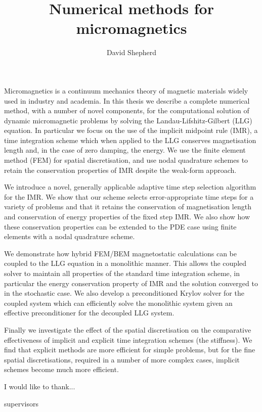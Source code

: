 \documentclass[12pt,PhD,a4paper,pdftex]{muthesis}
\title{Numerical methods for micromagnetics}
\author{David Shepherd}
\numberwithin{equation}{chapter} %
\begin{document}

\tablespagefalse

\beforeabstract
\abstracttitle
Micromagnetics is a continuum mechanics theory of magnetic materials widely used in industry and academia.
In this thesis we describe a complete numerical method, with a number of novel components, for the computational solution of dynamic micromagnetic problems by solving the Landau-Lifshitz-Gilbert  (LLG) equation.
In particular we focus on the use of the implicit midpoint rule (IMR), a time integration scheme which when applied to the LLG conserves magnetisation length and, in the case of zero damping, the energy.
We use the finite element method (FEM) for spatial discretisation, and use nodal quadrature schemes to retain the conservation properties of IMR despite the weak-form approach.

We introduce a novel, generally applicable adaptive time step selection algorithm for the IMR.
We show that our scheme selects error-appropriate time steps for a variety of problems and that it retains the conservation of magnetisation length and conservation of energy properties of the fixed step IMR.
We also show how these conservation properties can be extended to the PDE case using finite elements with a nodal quadrature scheme.

We demonstrate how hybrid FEM/BEM magnetostatic calculations can be coupled to the LLG equation in a monolithic manner.
This allows the coupled solver to maintain all properties of the standard time integration scheme, in particular the energy conservation property of IMR and the solution converged to in the stochastic case.
We also develop a preconditioned Krylov solver for the coupled system which can efficiently solve the monolithic system given an effective preconditioner for the decoupled LLG system.

Finally we investigate the effect of the spatial discretisation on the comparative effectiveness of implicit and explicit time integration schemes (\ie the stiffness).
We find that explicit methods are more efficient for simple problems, but for the fine spatial discretisations, required in a number of more complex cases, implicit schemes become much more efficient.

\afterabstract

I would like to thank...

supervisors
\end{document}
